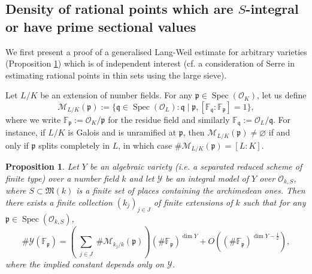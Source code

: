 \documentclass[11pt,letterpaper]{amsart}
\newcommand{\BF}{{\mathbb {F}}}
\newcommand{\CM}{{\mathcal {M}}}
\newcommand{\CO}{{\mathcal {O}}}
\newcommand{\CY}{{\mathcal {Y}}}
\theoremstyle{plain}
\numberwithin{equation}{section}
\newtheorem{proposition}[theorem]{Proposition}
\theoremstyle{definition}
\theoremstyle{remark}
\begin{document}
\subsection{Density of rational points which are $S$-integral or have prime sectional values}
We first present a proof of a generalised Lang-Weil estimate for arbitrary varieties (Proposition \ref{co:Lang-Weil}) which is of independent interest (cf. a consideration of Serre \cite[\S3.6]{Serre} in estimating rational points in thin sets using the large sieve).

Let $L/K$ be an extension of number fields. For any $\mathfrak{p}\in\operatorname{Spec}(\CO_K)$, let us define
\begin{equation}\label{eq:MLK}
	\CM_{L/K}(\mathfrak{p}):=\{\mathfrak{q}\in\operatorname{Spec}(\CO_L):\mathfrak{q}\mid\mathfrak{p},[\BF_{\mathfrak{q}}:\BF_{\mathfrak{p}}]=1\},
\end{equation}
where we write $\BF_{\mathfrak{p}}:=\CO_K/\mathfrak{p}$ for the residue field and similarly $\BF_{\mathfrak{q}}:=\CO_L/\mathfrak{q}$. For instance, if $L/K$ is Galois and is unramified at $\mathfrak{p}$, then $\CM_{L/K}(\mathfrak{p})\neq\varnothing$ if and only if $\mathfrak{p}$ splits completely in $L$, in which case $\#\CM_{L/K}(\mathfrak{p})=[L:K]$.
\begin{proposition}\label{co:Lang-Weil}
	Let $Y$ be an algebraic variety (i.e. a separated reduced scheme of finite type) over a number field $k$ and let $\CY$ be an integral model of $Y$ over $\CO_{k,S}$, where $S\subset \mathfrak{M}(k)$ is a finite set of places containing the archimedean ones. Then there exists a finite collection $(k_j)_{j\in J}$ of finite extensions of $k$ such that for any $\mathfrak{p}\in \operatorname{Spec}(\CO_{k,S})$,
	\begin{equation}\label{eq:Lang-Weil}
		\#\CY(\BF_{\mathfrak{p}})=\left(\sum_{\substack{j\in J}}\#\CM_{k_j/k}(\mathfrak{p})\right)(\#\BF_{\mathfrak{p}})^{\dim Y}+O((\#\BF_{\mathfrak{p}})^{\dim Y-\frac{1}{2}}),
	\end{equation}
	where the implied constant depends only on $\CY$.
\end{proposition}
\end{document}
